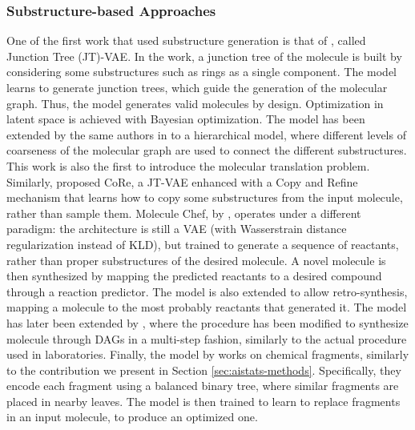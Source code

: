 \subsubsection*{Substructure-based Approaches}
One of the first work that used substructure generation is that of \citet{jin2018jtvae}, called Junction Tree (JT)-VAE. In the work, a junction tree of the molecule is built by considering some substructures such as rings as a single component. The model learns to generate junction trees, which guide the generation of the molecular graph. Thus, the model generates valid molecules by design. Optimization in latent space is achieved with Bayesian optimization. The model has been extended by the same authors in \citep{jin2019multimodalmoltranslation} to a hierarchical model, where different levels of coarseness of the molecular graph are used to connect the different substructures. This work is also the first to introduce the molecular translation problem. Similarly, \citet{fu2020core} proposed CoRe, a JT-VAE enhanced with a Copy and Refine mechanism that learns how to copy some substructures from the input molecule, rather than sample them. Molecule Chef, by \citet{bradshaw2019moleculechef}, operates under a different paradigm: the architecture is still a VAE (with Wasserstrain distance regularization instead of KLD), but trained to generate a sequence of reactants, rather than proper substructures of the desired molecule. A novel molecule is then synthesized by mapping the predicted reactants to a desired compound through a reaction predictor. The model is also extended to allow retro-synthesis, \ie mapping a molecule to the most probably reactants that generated it. The model has later been extended by \citet{bradshaw2020barking}, where the procedure has been modified to synthesize molecule through DAGs in a multi-step fashion, similarly to the actual procedure used in laboratories. Finally, the model by \citet{bostrom2019fragments} works on chemical fragments, similarly to the contribution we present in Section \ref{sec:aistats-methods}. Specifically, they encode each fragment using a balanced binary tree, where similar fragments are placed in nearby leaves. The model is then trained to learn to replace fragments in an input molecule, to produce an optimized one.

